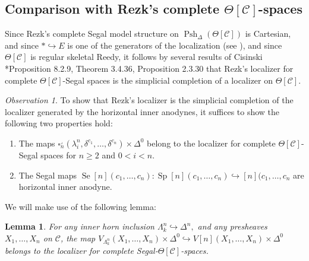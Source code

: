 \documentclass[leqno]{article}
\numberwithin{equation}{subsection}
\theoremstyle{plain}   %
\newtheorem{lemma}[equation]{Lemma}
\theoremstyle{remark}
\newtheorem{obs}[equation]{Observation}
\theoremstyle{plain}
\DeclareMathOperator{\Psh}{Psh}
\renewcommand{\C}{\ensuremath{\mathcal{C}}}
\begin{document}
\subsection{Comparison with Rezk's complete \(\Theta[\C]\)-spaces}\label{rezkcomparison}
Since Rezk's complete Segal model structure on \(\Psh_\Delta(\Theta[\C])\) is Cartesian, and since \(\ast \hookrightarrow E\) is one of the generators of the localization (see \cite{rezk-theta-n-spaces}), and since \(\Theta[\C]\) is regular skeletal Reedy, it follows by several results of Cisinski \cite{cisinski-book}*{Proposition 8.2.9, Theorem 3.4.36, Proposition 2.3.30} that Rezk's localizer for complete \(\Theta[\C]\)-Segal spaces is the simplicial completion of a localizer on \(\Theta[\C]\).  
\begin{obs}
	To show that Rezk's localizer is the simplicial completion of the localizer generated by the horizontal inner anodynes, it suffices to show the following two properties hold:
	\begin{enumerate}[\indent (i)] 
		\item The maps 
		\(\square_n^\lrcorner(\lambda^n_i,\delta^{c_1},\dots,\delta^{c_n})\times \Delta^0\) belong to the localizer for complete \(\Theta[\C]\)-Segal spaces for \(n\geq 2\) and \(0<i<n\).
		\item The Segal maps \(\operatorname{Se}[n](c_1,\dots,c_n): \operatorname{Sp}[n](c_1,\dots,c_n) \hookrightarrow [n](c_1,\dots,c_n\) are horizontal inner anodyne.
	\end{enumerate}
\end{obs}
We will make use of the following lemma:
\begin{lemma}\label{precatproperty}
	For any inner horn inclusion \(\Lambda^n_k\hookrightarrow \Delta^n,\) and any presheaves \(X_1,\dots,X_n\) on \(\C\), the map \(V_{\Lambda^n_k}(X_1,\dots,X_n)\times \Delta^0 \hookrightarrow V[n](X_1,\dots,X_n)\times \Delta^0\) belongs to the localizer for complete Segal-\(\Theta[\C]\)-spaces.
\end{lemma}
\end{document}
